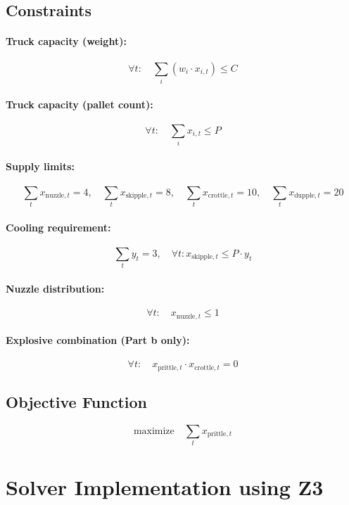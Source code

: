 \documentclass{article}
\begin{document}
\subsection{Constraints}
\paragraph{Truck capacity (weight):}
\[
\forall t: \quad \sum_i (w_i \cdot x_{i,t}) \leq C
\]

\paragraph{Truck capacity (pallet count):}
\[
\forall t: \quad \sum_i x_{i,t} \leq P
\]

\paragraph{Supply limits:}
\[
\sum_t x_{\text{nuzzle},t} = 4, \quad
\sum_t x_{\text{skipple},t} = 8, \quad
\sum_t x_{\text{crottle},t} = 10, \quad
\sum_t x_{\text{dupple},t} = 20
\]

\paragraph{Cooling requirement:}
\[
\sum_t y_t = 3, \quad \forall t: x_{\text{skipple},t} \leq P \cdot y_t
\]

\paragraph{Nuzzle distribution:}
\[
\forall t: \quad x_{\text{nuzzle},t} \leq 1
\]

\paragraph{Explosive combination (Part b only):}
\[
\forall t: \quad x_{\text{prittle},t} \cdot x_{\text{crottle},t} = 0
\]

\subsection{Objective Function}
\[
\text{maximize} \quad \sum_t x_{\text{prittle},t}
\]

\section{Solver Implementation using Z3}
\end{document}
